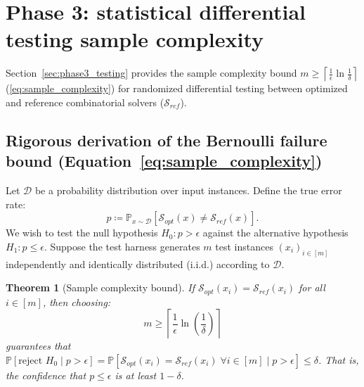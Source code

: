 \documentclass[11pt, letterpaper]{article}
\newtheorem{theorem}{Theorem}[section]
\begin{document}
\section{Phase 3: statistical differential testing sample complexity}
Section~\ref{sec:phase3_testing} provides the sample complexity bound $m \ge \left\lceil \frac{1}{\epsilon} \ln \frac{1}{\delta} \right\rceil$ (\ref{eq:sample_complexity}) for randomized differential testing between optimized and reference combinatorial solvers ($\mathcal{S}_{ref}$).

\subsection{Rigorous derivation of the Bernoulli failure bound (\texorpdfstring{Equation~\ref{eq:sample_complexity}}{Eq. 6})}
Let $\mathcal{D}$ be a probability distribution over input instances. Define the true error rate:
\begin{equation}
    p \coloneqq \mathbb{P}_{x \sim \mathcal{D}}[\mathcal{S}_{opt}(x) \neq \mathcal{S}_{ref}(x)].
\end{equation}
We wish to test the null hypothesis $H_0: p > \epsilon$ against the alternative hypothesis $H_1: p \le \epsilon$. 
Suppose the test harness generates $m$ test instances $(x_i)_{i \in [m]}$ independently and identically distributed (i.i.d.) according to $\mathcal{D}$. 

\begin{theorem}[Sample complexity bound]
If $\mathcal{S}_{opt}(x_i) = \mathcal{S}_{ref}(x_i)$ for all $i \in [m]$, then choosing:
\begin{equation}
    m \ge \left\lceil \frac{1}{\epsilon} \ln \left( \frac{1}{\delta} \right) \right\rceil
\end{equation}
guarantees that $\mathbb{P}[\text{reject } H_0 \mid p > \epsilon] = \mathbb{P}[\mathcal{S}_{opt}(x_i) = \mathcal{S}_{ref}(x_i) \; \forall i \in [m] \mid p > \epsilon] \le \delta$. That is, the confidence that $p \le \epsilon$ is at least $1 - \delta$.
\end{theorem}
\end{document}
